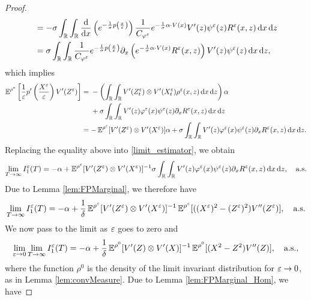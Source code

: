 \documentclass[10pt]{article}
\begin{document}
\begin{proof}
\begin{equation}
\begin{aligned}
	&= -\sigma \int_{\mathbb{R}} \int_{\mathbb{R}} \frac{\mathrm{d}}{\mathrm{d} x}\left( e^{ - \frac{1}{\sigma} p \left ( \frac{x}{\varepsilon} \right)} \right) \frac{1}{C_{\varphi^\varepsilon}} e^{- \frac{1}{\sigma} \alpha \cdot V(x)} V'(z) \psi^\varepsilon(z) R^\varepsilon(x,z) \,\mathrm{d} x \,\mathrm{d} z \\
	&= \sigma \int_{\mathbb{R}} \int_{\mathbb{R}} \frac{1}{C_{\varphi^\varepsilon}} e^{ - \frac{1}{\sigma} p \left ( \frac{x}{\varepsilon} \right)} \partial_x \left ( e^{- \frac{1}{\sigma} \alpha \cdot V(x)} R^\varepsilon(x,z) \right ) V'(z) \psi^\varepsilon(z) \,\mathrm{d} x \,\mathrm{d} z,
\end{aligned}
\end{equation}
which implies
\begin{align}
	\operatorname{\mathbb{E}}^{\rho^\varepsilon} \left [ \frac{1}{\varepsilon} p' \left ( \frac{X^\varepsilon}{\varepsilon} \right ) V'(Z^\varepsilon) \right ] &= 
	\begin{aligned}[t]
		&- \left(\int_{\mathbb{R}} \int_{\mathbb{R}} V'(Z^\varepsilon_t) \otimes V'(X^\varepsilon_t) \rho^\varepsilon(x, z) \,\mathrm{d} x \,\mathrm{d} z\right) \alpha \\
		&+\sigma \int_{\mathbb{R}} \int_{\mathbb{R}} V'(z) \varphi^\varepsilon(x) \psi^\varepsilon(z) \partial_x R^\varepsilon(x,z) \,\mathrm{d} x \,\mathrm{d} z 
	\end{aligned}
	\\
	&= -  \operatorname{\mathbb{E}}^{\rho^\varepsilon} [ V'(Z^\varepsilon) \otimes V'(X^\varepsilon) ]\alpha + \sigma \int_{\mathbb{R}} \int_{\mathbb{R}} V'(z) \varphi^\varepsilon(x) \psi^\varepsilon(z) \partial_x R^\varepsilon(x,z) \,\mathrm{d} x \,\mathrm{d} z.
\end{align}
Replacing the equality above into \eqref{limit_estimator}, we obtain
\begin{equation}
\lim_{T \to \infty} I_1^\varepsilon(T) = -\alpha + \operatorname{\mathbb{E}}^{\rho^\varepsilon} [ V'(Z^\varepsilon) \otimes V'(X^\varepsilon) ]^{-1} \sigma \int_{\mathbb{R}} \int_{\mathbb{R}} V'(z) \varphi^\varepsilon(x) \psi^\varepsilon(z) \partial_x R^\varepsilon(x,z) \,\mathrm{d} x \,\mathrm{d} z, \quad \text{a.s.}
\end{equation}
Due to Lemma \ref{lem:FPMarginal}, we therefore have
\begin{equation}
	\lim_{T \to \infty} I_1^\varepsilon(T) = -\alpha + \frac1\delta \operatorname{\mathbb{E}}^{\rho^\varepsilon} [ V'(Z^\varepsilon) \otimes V'(X^\varepsilon) ]^{-1} \operatorname{\mathbb{E}}^{\rho^\varepsilon}[((X^\varepsilon)^2 - (Z^\varepsilon)^2)V''(Z^\varepsilon)], \quad \text{a.s.}	
\end{equation}
We now pass to the limit as $\varepsilon$ goes to zero and
\begin{equation} \label{limit_estimator_2}
	\lim_{\varepsilon \to 0} \lim_{T \to \infty} I_1^\varepsilon(T) = -\alpha + \frac1\delta \operatorname{\mathbb{E}}^{\rho^0} [ V'(Z) \otimes V'(X) ]^{-1} \operatorname{\mathbb{E}}^{\rho^0}[(X^2 - Z^2)V''(Z)], \quad \text{a.s.},
\end{equation}
where the function $\rho^0$ is the density of the limit invariant distribution for $\varepsilon \to 0$, as in Lemma \ref{lem:convMeasure}. Due to Lemma \ref{lem:FPMarginal_Hom}, we have

\end{proof}
\end{document}
